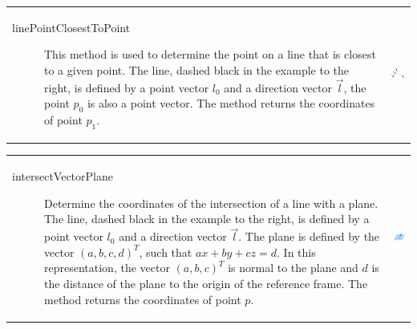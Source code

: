 \begin{tabular}{l l}
\begin{minipage}{0.7\textwidth}
\begin{description}
\item[linePointClosestToPoint] This method is used to determine the point on a line that is closest to a given point. The line, dashed black in the example to the right, is defined by a point vector $l_0$ and a direction vector $\vec{l}$, the point $p_0$ is also a point vector. The method returns the coordinates of point $p_1$.
\end{description}
\end{minipage}
&
\begin{minipage}{0.3\textwidth}
\includegraphics[width=2.5cm]{pointlcp.png}
\end{minipage}
\end{tabular}

\begin{tabular}{l l}
\begin{minipage}{0.7\textwidth}
\begin{description}
\item[intersectVectorPlane] Determine the coordinates of the intersection of a line with a plane. The line, dashed black in the example to the right, is defined by a point vector $l_0$ and a direction vector $\vec{l}$. The plane is defined by the vector $(a, b, c, d)^T$, such that $ax + by + cz = d$. In this representation, the vector $(a,b,c)^T$ is normal to the plane and $d$ is the distance of the plane to the origin of the reference frame. The method returns the coordinates of point $p$.
\end{description}
\end{minipage}
&
\begin{minipage}{0.3\textwidth}
\includegraphics[width=3cm]{intersectvectorplane.png}
\end{minipage}
\end{tabular}

